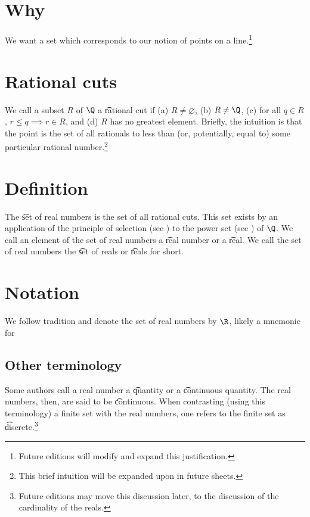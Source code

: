 

\section*{Why}

We want a set which corresponds to our notion of points on a line.\footnote{Future editions will modify and expand this justification.}

\section*{Rational cuts}

We call a subset $R$ of $\Q $ a \t{rational cut} if (a) $R \neq \varnothing$, (b) $R \neq \Q $, (c) for all $q \in R$, $r \leq q \implies r \in R$, and (d) $R$ has no greatest element.
Briefly, the intuition is that the point is the set of all rationals to less than (or, potentially, equal to) some particular rational number.\footnote{This brief intuition will be expanded upon in future sheets.}

\section*{Definition}

The \t{set of real numbers} is the set of all rational cuts.
This set exists by an application of the principle of selection (see ) to the power set (see ) of $\Q $.
We call an element of the set of real numbers a \t{real number} or a \t{real}.
We call the set of real numbers the \t{set of reals} or \t{reals} for short.
\section*{Notation}

We follow tradition and denote the set of real numbers by $\R $, likely a mnemonic for 

\subsection*{Other terminology}

Some authors call a real number a \t{quantity} or a \t{continuous quantity}.
The real numbers, then, are said to be \t{continuous}.
When contrasting (using this terminology) a finite set with the real numbers, one refers to the finite set as \t{discrete}.\footnote{Future editions may move this discussion later, to the discussion of the cardinality of the reals.}
